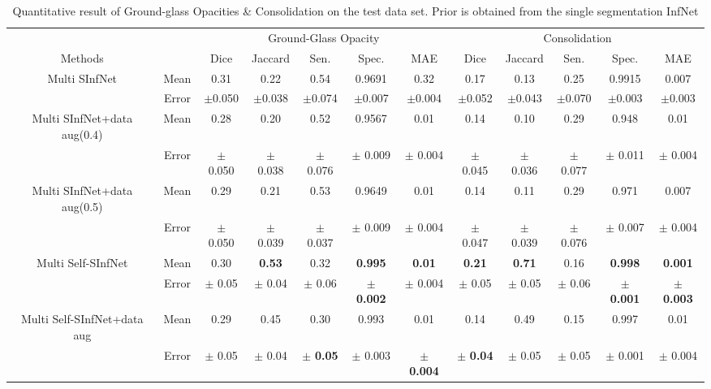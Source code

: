 \begin{table}[!h]
	\small
	\centering
	\begin{tabular}{| c | c || c c c c c || c c c c c |}
		\hline
		& &\multicolumn{5}{c||}{Ground-Glass Opacity} & \multicolumn{5}{c|}{Consolidation}\\ \cline{3-12}
		Methods & & Dice & Jaccard & Sen. & Spec. & MAE & Dice & Jaccard & Sen. & Spec. & MAE \\\hline
		Multi SInfNet & Mean & 0.31 & 0.22 & 0.54 & 0.9691 & 0.32 & 0.17 & 0.13  & 0.25 & 0.9915 & 0.007  \\ \cline{2-12}
		& Error & $\pm$0.050 & $\pm$0.038 & $\pm$0.074 & $\pm$0.007 & $\pm$0.004 & $\pm$0.052 & $\pm$0.043 & $\pm$0.070 & $\pm$0.003 & $\pm$0.003 \\ \hline \hline
		
		Multi SInfNet+data aug(0.4) & Mean & 0.28 & 0.20 & 0.52 & 0.9567 & 0.01 & 0.14 & 0.10 & 0.29 & 0.948 & 0.01  \\ \cline{2-12}
		& Error & $\pm$ 0.050 & $\pm$ 0.038 & $\pm$ 0.076 & $\pm$ 0.009 & $\pm$ 0.004 & $\pm$ 0.045 & $\pm$ 0.036 & $\pm$ 0.077 & $\pm$ 0.011 & $\pm$ 0.004  \\ \hline \hline
		
		Multi SInfNet+data aug(0.5) & Mean & 0.29 & 0.21 & 0.53 & 0.9649 & 0.01 & 0.14 & 0.11 & 0.29 & 0.971 & 0.007  \\ \cline{2-12}
		& Error & $\pm$ 0.050 & $\pm$ 0.039 & $\pm$ 0.037 & $\pm$ 0.009 & $\pm$ 0.004 & $\pm$ 0.047 & $\pm$ 0.039 & $\pm$ 0.076 & $\pm$ 0.007 & $\pm$ 0.004  \\ \hline \hline
		
		Multi Self-SInfNet & Mean & 0.30 & \textbf{0.53} & 0.32 & \textbf{0.995} & \textbf{0.01} & \textbf{0.21} & \textbf{0.71} & 0.16 & \textbf{0.998} & \textbf{0.001}  \\ \cline{2-12}
		& Error & $\pm$ 0.05 & $\pm$ 0.04 & $\pm$ 0.06 & $\pm$ \textbf{0.002} & $\pm$ 0.004 & $\pm$ 0.05 & $\pm$ 0.05 & $\pm$ 0.06 & $\pm$ \textbf{0.001} & $\pm$ \textbf{0.003}  \\ \hline \hline
		
		Multi Self-SInfNet+data aug & Mean & 0.29 & 0.45 & 0.30 & 0.993 & 0.01 & 0.14 & 0.49 & 0.15 & 0.997 & 0.01  \\ \cline{2-12}
		& Error & $\pm$ 0.05 & $\pm$ 0.04 & $\pm$ \textbf{0.05} & $\pm$ 0.003 & $\pm$ \textbf{0.004} & $\pm$ \textbf{0.04} & $\pm$ 0.05 & $\pm$ 0.05 & $\pm$ 0.001 & $\pm$ 0.004  \\ \hline \hline
	\end{tabular}
	\caption{Quantitative result of Ground-glass Opacities \& Consolidation on the test data set. Prior is obtained from the single segmentation InfNet}
	\label{tab:multi-weakprior}
\end{table}

